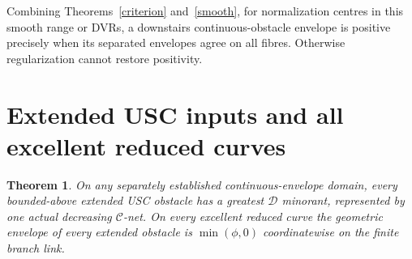 \documentclass[11pt]{article}
\newtheorem{theorem}{Theorem}
\newcommand{\C}{\mathcal C}
\newcommand{\D}{\mathcal D}
\begin{document}
Combining Theorems~\ref{criterion} and~\ref{smooth}, for normalization centres
in this smooth range or DVRs, a downstairs continuous-obstacle envelope is
positive precisely when its separated envelopes agree on all fibres.
Otherwise regularization cannot restore positivity.

\section{Extended USC inputs and all excellent reduced curves}
\begin{theorem}
On any separately established continuous-envelope domain, every bounded-above
extended USC obstacle has a greatest $\D$ minorant, represented by one actual
decreasing $\C$-net. On every excellent reduced curve the geometric envelope
of every extended obstacle is $\min(\phi,0)$ coordinatewise on the finite branch link.
\end{theorem}
\end{document}

